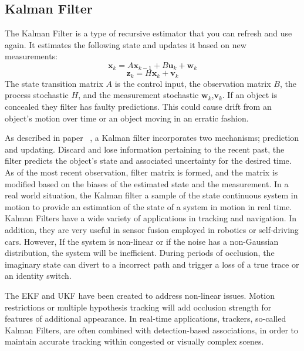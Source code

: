 \documentclass[12pt,a4paper]{report}
\theoremstyle{definition}
\theoremstyle{remark}
\begin{document}
\subsection{Kalman Filter}
The Kalman Filter is a type of recursive estimator that you can refresh and use again. It estimates the following state and updates it based on new measurements:
\begin{equation}
\mathbf{x}_k = A \mathbf{x}_{k-1} + B \mathbf{u}_k + \mathbf{w}_k
\end{equation}
\begin{equation}
\mathbf{z}_k = H \mathbf{x}_k + \mathbf{v}_k
\end{equation}
The state transition matrix $A$ is the control input, the observation matrix $B$, the process stochastic $H$, and the measurement stochastic $\mathbf{w}_k$,$\mathbf{v}_k$.
If an object is concealed they filter has faulty predictions. This could cause drift from an object’s motion over time or an object moving in an erratic fashion.  

As described in paper ~\cite{44}, a Kalman filter incorporates two mechanisms; prediction and updating. Discard and lose information pertaining to the recent past, the filter predicts the object’s state and associated uncertainty for the desired time. As of the most recent observation, filter matrix is formed, and the matrix is modified based on the biases of the estimated state and the measurement. In a real world situation, the Kalman filter a sample of the state continuous system in motion to provide an estimation of the state of a system in motion in real time. Kalman Filters have a wide variety of applications in tracking and navigation. In addition, they are very useful in sensor fusion employed in robotics or self-driving cars. However, If the system is non-linear or if the noise has a non-Gaussian distribution, the system will be inefficient. During periods of occlusion, the imaginary state can divert to a incorrect path and trigger a loss of a true trace or an identity switch.

The EKF and UKF have been created to address non-linear issues. Motion restrictions or multiple hypothesis tracking will add occlusion strength for features of additional appearance. In real-time applications, trackers, so-called Kalman Filters, are often combined with detection-based associations, in order to maintain accurate tracking within congested or visually complex scenes.
\end{document}
